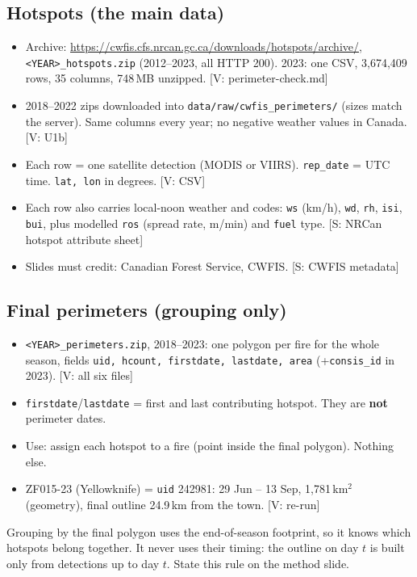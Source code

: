 \documentclass[11pt,a4paper]{article}
\newcommand{\tagbox}[2]{{\footnotesize\color{#1}\textsf{[#2]}}}
\newcommand{\supp}[1]{\tagbox{ForestGreen!70!black}{S: #1}}  %
\newcommand{\veri}[1]{\tagbox{ForestGreen!70!black}{V: #1}}  %
\newcommand{\code}[1]{\texttt{\small #1}}
\begin{document}
\subsection{Hotspots (the main data)}
\begin{itemize}
\item Archive: \url{https://cwfis.cfs.nrcan.gc.ca/downloads/hotspots/archive/}, \code{<YEAR>\_hotspots.zip}
  (2012--2023, all HTTP 200). 2023: one CSV, 3{,}674{,}409 rows, 35 columns, 748\,MB unzipped. \veri{perimeter-check.md}
\item 2018--2022 zips downloaded into \code{data/raw/cwfis\_perimeters/} (sizes match the server). Same columns
  every year; no negative weather values in Canada. \veri{U1b}
\item Each row = one satellite detection (MODIS or VIIRS). \code{rep\_date} = UTC time. \code{lat, lon} in degrees.
  \veri{CSV}
\item Each row also carries local-noon weather and codes: \code{ws} (km/h), \code{wd}, \code{rh}, \code{isi},
  \code{bui}, plus modelled \code{ros} (spread rate, m/min) and \code{fuel} type.
  \supp{NRCan hotspot attribute sheet}
\item Slides must credit: Canadian Forest Service, CWFIS. \supp{CWFIS metadata}
\end{itemize}

\subsection{Final perimeters (grouping only)}
\begin{itemize}
\item \code{<YEAR>\_perimeters.zip}, 2018--2023: one polygon per fire for the whole season, fields
  \code{uid, hcount, firstdate, lastdate, area} (+\code{consis\_id} in 2023). \veri{all six files}
\item \code{firstdate}/\code{lastdate} = first and last contributing hotspot. They are \textbf{not} perimeter dates.
\item Use: assign each hotspot to a fire (point inside the final polygon). Nothing else.
\item ZF015-23 (Yellowknife) = \code{uid} 242981: 29 Jun -- 13 Sep, 1{,}781\,km$^2$ (geometry), final outline
  24.9\,km from the town. \veri{re-run}
\end{itemize}

\begin{watch}
Grouping by the final polygon uses the end-of-season footprint, so it knows which hotspots belong together. It never
uses their timing: the outline on day $t$ is built only from detections up to day $t$. State this rule on the
method slide.
\end{watch}
\end{document}
